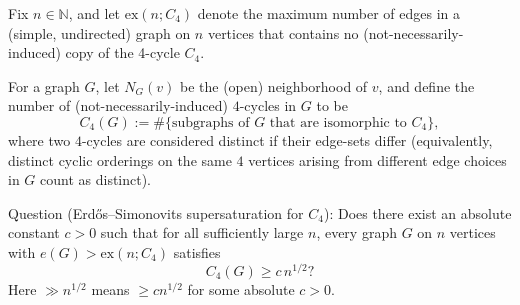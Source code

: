 Fix $n\in\mathbb{N}$, and let $\mathrm{ex}(n;C_4)$ denote the maximum number of edges in a 
(simple, undirected) graph on $n$ vertices that contains no (not-necessarily-induced) copy of the 4-cycle $C_4$.

For a graph $G$, let $N_G(v)$ be the (open) neighborhood of $v$, and define the number of (not-necessarily-induced) 
$4$-cycles in $G$ to be
\[
C_4(G):=\#\{\text{subgraphs of $G$ that are isomorphic to $C_4$}\},
\]
where two $4$-cycles are considered distinct if their edge-sets differ (equivalently, distinct cyclic orderings on the 
same $4$ vertices arising from different edge choices in $G$ count as distinct).

Question (Erd\H{o}s--Simonovits supersaturation for $C_4$):
Does there exist an absolute constant $c>0$ such that for all sufficiently large $n$, every graph $G$ on $n$ vertices 
with $e(G)>\mathrm{ex}(n;C_4)$ satisfies
\[
C_4(G)\ge c\,n^{1/2}?
\]
Here $\gg n^{1/2}$ means $\ge c n^{1/2}$ for some absolute $c>0$.
